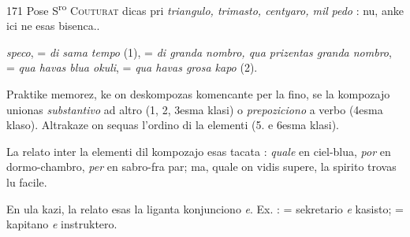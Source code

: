 \begin{VUpage}[175]{171}
{Pose S\textsuperscript{ro} \textsc{Couturat} dicas pri \textit{triangulo, trimasto, centyaro, mil}\cc
\textit{pedo} : nu, anke ici ne esas bisenca..%
}

\VUcontinue
\textit{speco},  = \textit{di sama tempo} (1),  =\nl
\textit{di granda nombro, qua prizentas granda nombro}, \nl
= \textit{qua havas blua okuli},  = \textit{qua havas grosa kapo} (2).\parplein

Praktike memorez, ke on deskompozas komencante per la\nl
fino, se la kompozajo unionas \textit{substantivo} ad altro (1, 2,\nl
3esma klasi) o \textit{prepoziciono} a verbo (4esma klaso). Altrakaze\nl
on sequas l'ordino di la elementi (5. e 6esma klasi).

La relato inter la elementi dil kompozajo esas tacata :\nl
\textit{quale} en ciel-blua, \textit{por} en dormo-chambro, \textit{per} en sabro-fra\cc
par; ma, quale on vidis supere, la spirito trovas lu facile.\parplein

En ula kazi, la relato esas la liganta konjunciono \textit{e}. Ex. :\nl
{} = sekretario \textit{e} kasisto; \cc
{} = kapitano \textit{e} instruktero.
\end{VUpage}

